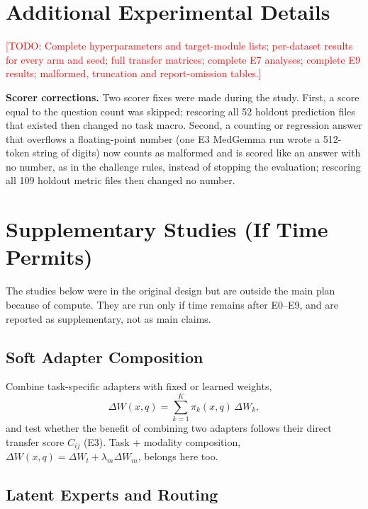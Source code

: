 \documentclass[journal,twoside,web]{ieeecolor}
\newcommand{\todo}[1]{\textcolor{red}{[TODO: #1]}}
\begin{document}
\appendices

\section{Additional Experimental Details}

\todo{Complete hyperparameters and target-module lists; per-dataset results
for every arm and seed; full transfer matrices; complete E7 analyses;
complete E9 results; malformed, truncation and report-omission tables.}

\textbf{Scorer corrections.} Two scorer fixes were made during the study.
First, a score equal to the question count was skipped; rescoring all 52
holdout prediction files that existed then changed no task macro. Second, a
counting or regression answer that overflows a floating-point number (one E3
MedGemma run wrote a 512-token string of digits) now counts as malformed and
is scored like an answer with no number, as in the challenge rules, instead
of stopping the evaluation; rescoring all 109 holdout metric files then
changed no number.


\section{Supplementary Studies (If Time Permits)}
\label{sec:supplementary}

The studies below were in the original design but are outside the main
plan because of compute. They are run only if time remains after E0--E9,
and are reported as supplementary, not as main claims.

\subsection{Soft Adapter Composition}

Combine task-specific adapters with fixed or learned weights,
\begin{equation}
\Delta W(x,q)=\sum_{k=1}^{K}\pi_k(x,q)\,\Delta W_k,
\end{equation}
and test whether the benefit of combining two adapters follows their direct
transfer score $C_{ij}$ (E3). Task + modality composition,
$\Delta W(x,q)=\Delta W_t+\lambda_m\Delta W_m$, belongs here too.

\subsection{Latent Experts and Routing}
\end{document}
